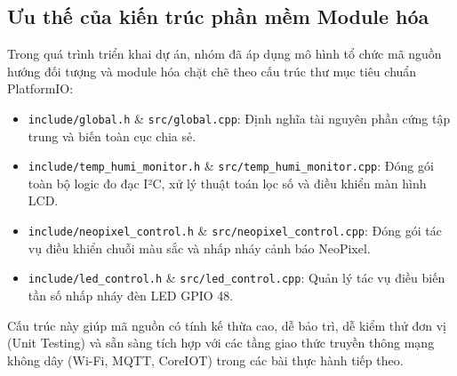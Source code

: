 \subsection{Ưu thế của kiến trúc phần mềm Module hóa}
Trong quá trình triển khai dự án, nhóm đã áp dụng mô hình tổ chức mã nguồn hướng đối tượng và module hóa chặt chẽ theo cấu trúc thư mục tiêu chuẩn PlatformIO:
\begin{itemize}[leftmargin=*]
    \item \texttt{include/global.h} \& \texttt{src/global.cpp}: Định nghĩa tài nguyên phần cứng tập trung và biến toàn cục chia sẻ.
    \item \texttt{include/temp\_humi\_monitor.h} \& \texttt{src/temp\_humi\_monitor.cpp}: Đóng gói toàn bộ logic đo đạc I²C, xử lý thuật toán lọc số và điều khiển màn hình LCD.
    \item \texttt{include/neopixel\_control.h} \& \texttt{src/neopixel\_control.cpp}: Đóng gói tác vụ điều khiển chuỗi màu sắc và nhấp nháy cảnh báo NeoPixel.
    \item \texttt{include/led\_control.h} \& \texttt{src/led\_control.cpp}: Quản lý tác vụ điều biến tần số nhấp nháy đèn LED GPIO 48.
\end{itemize}
Cấu trúc này giúp mã nguồn có tính kế thừa cao, dễ bảo trì, dễ kiểm thử đơn vị (Unit Testing) và sẵn sàng tích hợp với các tầng giao thức truyền thông mạng không dây (Wi-Fi, MQTT, CoreIOT) trong các bài thực hành tiếp theo.
